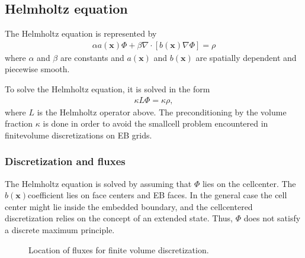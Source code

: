 \documentclass[letterpaper,10pt,english]{sphinxmanual}
\let\sphinxpxdimen\pdfpxdimen\else\newdimen\sphinxpxdimen
\begin{document}
\subsection{Helmholtz equation}
\label{\detokenize{Source/LinearSolvers:helmholtz-equation}}\label{\detokenize{Source/LinearSolvers:chap-helmholtz}}
\sphinxAtStartPar
The Helmholtz equation is represented by
\begin{equation*}
\begin{split}\alpha a\left(\mathbf{x}\right)\Phi + \beta\nabla\cdot\left[b\left(\mathbf{x}\right)\nabla\Phi\right] = \rho\end{split}
\end{equation*}
\sphinxAtStartPar
where \(\alpha\) and \(\beta\) are constants and \(a\left(\mathbf{x}\right)\) and \(b\left(\mathbf{x}\right)\) are spatially dependent and piecewise smooth.

\sphinxAtStartPar
To solve the Helmholtz equation, it is solved in the form
\begin{equation*}
\begin{split}\kappa L\Phi = \kappa\rho,\end{split}
\end{equation*}
\sphinxAtStartPar
where \(L\) is the Helmholtz operator above.
The preconditioning by the volume fraction \(\kappa\) is done in order to avoid the small\sphinxhyphen{}cell problem encountered in finite\sphinxhyphen{}volume discretizations on EB grids.


\subsubsection{Discretization and fluxes}
\label{\detokenize{Source/LinearSolvers:discretization-and-fluxes}}
\sphinxAtStartPar
The Helmholtz equation is solved by assuming that \(\Phi\) lies on the cell\sphinxhyphen{}center.
The \(b\left(\mathbf{x}\right)\)\sphinxhyphen{}coefficient lies on face centers and EB faces.
In the general case the cell center might lie inside the embedded boundary, and the cell\sphinxhyphen{}centered discretization relies on the concept of an extended state.
Thus, \(\Phi\) does not satisfy a discrete maximum principle.

\begin{figure}[htb]
\centering
\capstart

\noindent\sphinxincludegraphics[width=360\sphinxpxdimen]{{CutCell}.png}
\caption{Location of fluxes for finite volume discretization.}\label{\detokenize{Source/LinearSolvers:id1}}\label{\detokenize{Source/LinearSolvers:fig-helmholtzfluxes}}\end{figure}
\end{document}
